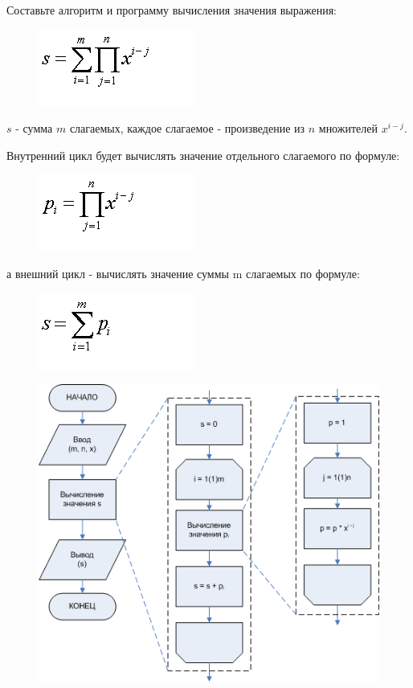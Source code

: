 \documentclass{beamer}
\begin{document}
\begin{frame}
Составьте алгоритм и программу вычисления значения выражения: 
\begin{figure}[h]
\centering
\includegraphics[scale=0.5]{images/lec04-pic14.png}
\end{figure}
$s$ - сумма $m$ слагаемых, каждое слагаемое - произведение из $n$ множителей $x^{i-j}$.

Внутренний цикл будет вычислять значение отдельного слагаемого по формуле:
\begin{figure}[h]
\centering
\includegraphics[scale=0.5]{images/lec04-pic15.png}
\end{figure}
а внешний цикл - вычислять значение суммы m слагаемых по формуле:
\begin{figure}[h]
\centering
\includegraphics[scale=0.5]{images/lec04-pic16.png}
\end{figure}
\end{frame}

\begin{frame}[fragile]
\begin{figure}[h]
\includegraphics[scale=0.75]{images/lec04-pic17.png}
\end{figure}
\end{frame}
\end{document}
